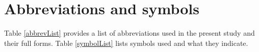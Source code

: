 %


\chapter*{Abbreviations and symbols}\label{abbreviations}

Table \vref{abbrevList} provides a list of abbreviations used in the present study and their full forms. %
Table \ref{symbolList} lists symbols used and what they indicate. 

